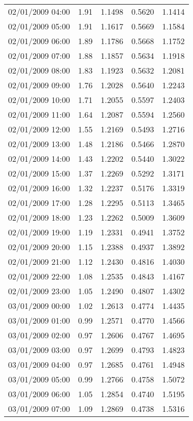 \begin{longtable}{|l|r|r|r|r|}
02/01/2009 04:00 & 1.91 & 1.1498 & 0.5620 & 1.1414 \\
02/01/2009 05:00 & 1.91 & 1.1617 & 0.5669 & 1.1584 \\
02/01/2009 06:00 & 1.89 & 1.1786 & 0.5668 & 1.1752 \\
02/01/2009 07:00 & 1.88 & 1.1857 & 0.5634 & 1.1918 \\
02/01/2009 08:00 & 1.83 & 1.1923 & 0.5632 & 1.2081 \\
02/01/2009 09:00 & 1.76 & 1.2028 & 0.5640 & 1.2243 \\
02/01/2009 10:00 & 1.71 & 1.2055 & 0.5597 & 1.2403 \\
02/01/2009 11:00 & 1.64 & 1.2087 & 0.5594 & 1.2560 \\
02/01/2009 12:00 & 1.55 & 1.2169 & 0.5493 & 1.2716 \\
02/01/2009 13:00 & 1.48 & 1.2186 & 0.5466 & 1.2870 \\
02/01/2009 14:00 & 1.43 & 1.2202 & 0.5440 & 1.3022 \\
02/01/2009 15:00 & 1.37 & 1.2269 & 0.5292 & 1.3171 \\
02/01/2009 16:00 & 1.32 & 1.2237 & 0.5176 & 1.3319 \\
02/01/2009 17:00 & 1.28 & 1.2295 & 0.5113 & 1.3465 \\
02/01/2009 18:00 & 1.23 & 1.2262 & 0.5009 & 1.3609 \\
02/01/2009 19:00 & 1.19 & 1.2331 & 0.4941 & 1.3752 \\
02/01/2009 20:00 & 1.15 & 1.2388 & 0.4937 & 1.3892 \\
02/01/2009 21:00 & 1.12 & 1.2430 & 0.4816 & 1.4030 \\
02/01/2009 22:00 & 1.08 & 1.2535 & 0.4843 & 1.4167 \\
02/01/2009 23:00 & 1.05 & 1.2490 & 0.4807 & 1.4302 \\
03/01/2009 00:00 & 1.02 & 1.2613 & 0.4774 & 1.4435 \\
03/01/2009 01:00 & 0.99 & 1.2571 & 0.4770 & 1.4566 \\
03/01/2009 02:00 & 0.97 & 1.2606 & 0.4767 & 1.4695 \\
03/01/2009 03:00 & 0.97 & 1.2699 & 0.4793 & 1.4823 \\
03/01/2009 04:00 & 0.97 & 1.2685 & 0.4761 & 1.4948 \\
03/01/2009 05:00 & 0.99 & 1.2766 & 0.4758 & 1.5072 \\
03/01/2009 06:00 & 1.05 & 1.2854 & 0.4740 & 1.5195 \\
03/01/2009 07:00 & 1.09 & 1.2869 & 0.4738 & 1.5316 \\

\end{longtable}
